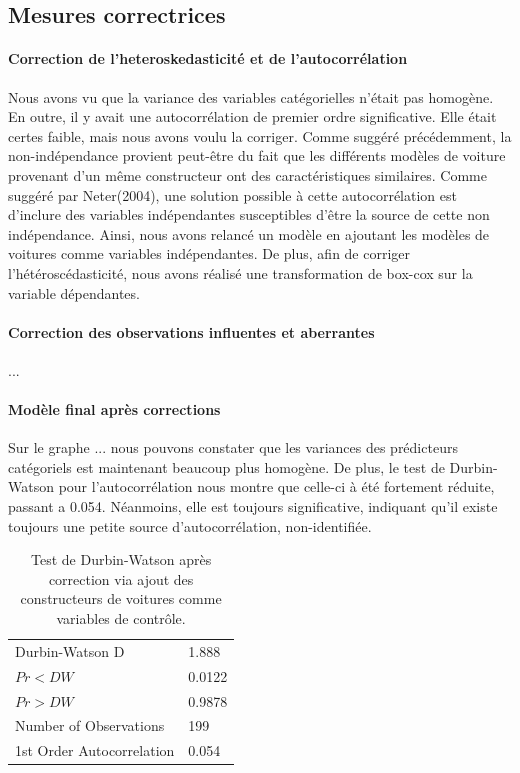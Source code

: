\documentclass[11pt,a4paper]{article}
\begin{document}
\subsection{Mesures correctrices}
\paragraph{Correction de l'heteroskedasticité et de l'autocorrélation}
Nous avons vu que la variance des variables catégorielles n'était pas homogène. En outre, il y avait une autocorrélation de premier ordre significative. Elle était certes faible, mais nous avons voulu la corriger. Comme suggéré précédemment, la non-indépendance provient peut-être du fait que les différents modèles de voiture provenant d'un même constructeur ont des caractéristiques similaires. Comme suggéré par Neter(2004), une solution possible à cette autocorrélation est d'inclure des variables indépendantes susceptibles d'être la source de cette non indépendance. Ainsi, nous avons relancé un modèle en ajoutant les modèles de voitures comme variables indépendantes. De plus, afin de corriger l'hétéroscédasticité, nous avons réalisé une transformation de box-cox sur la variable dépendantes.

\paragraph{Correction des observations influentes et aberrantes}
...


\paragraph{Modèle final après corrections}
Sur le graphe ... nous pouvons constater que les variances des prédicteurs catégoriels est maintenant beaucoup plus homogène.
De plus, le test de Durbin-Watson pour l'autocorrélation nous montre que celle-ci à été fortement réduite, passant a 0.054. Néanmoins, elle est toujours significative, indiquant qu'il existe toujours une petite source d'autocorrélation, non-identifiée.


\begin{table}
	\scriptsize
	\centering
	\begin{tabulary}{1\textwidth}{LL}\hline
		Durbin-Watson D &    1.888\\
		$Pr < DW$ &    0.0122\\
		$Pr > DW$ &    0.9878\\
		Number of Observations &    199\\
		1st Order Autocorrelation &    0.054\\\hline
	\end{tabulary}
	\caption{Test de Durbin-Watson après correction via ajout des constructeurs de voitures comme variables de contrôle.}
	\label{table:dwcorrected}
\end{table}
\end{document}

